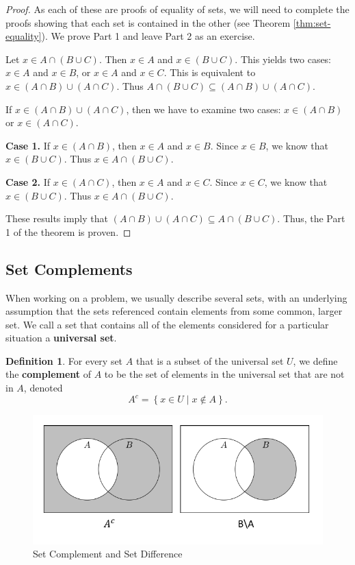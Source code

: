 \documentclass[
]{book}
\theoremstyle{definition}
\newtheorem{definition}{Definition}[chapter]
\theoremstyle{definition}
\theoremstyle{definition}
\theoremstyle{definition}
\theoremstyle{remark}
\begin{document}
\begin{proof}
As each of these are proofs of equality of sets, we will need to complete the proofs showing that each set is contained in the other (see Theorem \ref{thm:set-equality}). We prove Part 1 and leave Part 2 as an exercise.

Let \(x\in A \cap (B \cup C)\). Then \(x\in A\) and \(x\in (B\cup C)\). This yields two cases: \(x\in A\) and \(x\in B\), or \(x\in A\) and \(x\in C\). This is equivalent to \(x \in (A\cap B) \cup (A\cap C)\). Thus \(A \cap (B \cup C) \subseteq (A \cap B) \cup (A \cap C)\).

If \(x\in (A \cap B) \cup (A \cap C)\), then we have to examine two cases: \(x\in (A\cap B)\) or \(x\in (A \cap C)\).

\textbf{Case 1.} If \(x\in (A\cap B)\), then \(x\in A\) and \(x\in B\). Since \(x\in B\), we know that \(x\in (B\cup C)\). Thus \(x\in A \cap (B\cup C)\).

\textbf{Case 2.} If \(x \in (A\cap C)\), then \(x\in A\) and \(x\in C\). Since \(x\in C\), we know that \(x \in (B\cup C)\). Thus \(x \in A \cap (B\cup C)\).

These results imply that \((A \cap B) \cup (A \cap C) \subseteq A \cap (B \cup C)\). Thus, the Part 1 of the theorem is proven.
\end{proof}

\hypertarget{set-complements}{%
\subsection{Set Complements}\label{set-complements}}

When working on a problem, we usually describe several sets, with an underlying assumption that the sets referenced contain elements from some common, larger set. We call a set that contains all of the elements considered for a particular situation a \textbf{universal set}.

\begin{definition}
\protect\hypertarget{def:set-complement}{}\label{def:set-complement}For every set \(A\) that is a subset of the universal set \(U\), we define the \textbf{complement} of \(A\) to be the set of elements in the universal set that are not in \(A\), denoted
\[A^c=\left\{ x\in U \middle \vert x \notin A\right\}.\]
\end{definition}

\begin{figure}

{\centering \includegraphics[width=0.8\linewidth]{tikz/set-difference} 

}

\caption{Set Complement and Set Difference}\label{fig:set-difference}
\end{figure}
\end{document}
